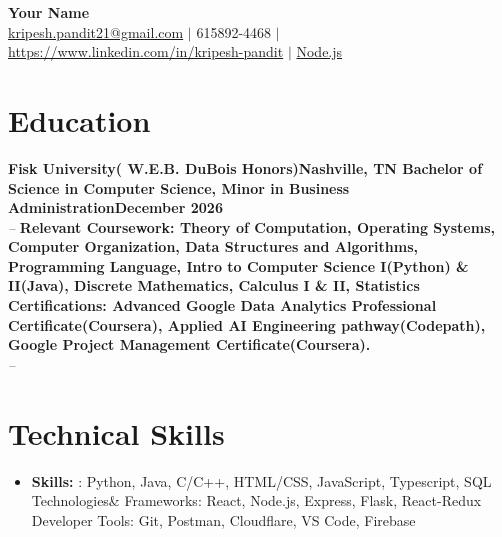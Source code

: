 \documentclass[letterpaper,11pt]{article}
\begin{document}
\begin{center}
  {\LARGE\bfseries Your Name} \\[4pt]
  \small
  \href{mailto:kripesh.pandit21@gmail.com}{kripesh.pandit21@gmail.com}   $|$ 615892-4468   $|$ \href{https://https://www.linkedin.com/in/kripesh-pandit}{https://www.linkedin.com/in/kripesh-pandit}     $|$ \href{https://Node.js}{Node.js}\end{center}

\section{Education}
\textbf{Fisk University( W.E.B. DuBois Honors)Nashville, TN
    Bachelor of Science in Computer Science, Minor in Business AdministrationDecember 2026} \hfill  \\
\textit{} \hfill \textit{ -- }
\vspace{2pt}\textbf{Relevant Coursework: Theory of Computation, Operating Systems, Computer Organization, Data Structures and Algorithms, Programming Language, Intro to Computer Science I(Python) \& II(Java), Discrete Mathematics, Calculus I \& II, Statistics 
 Certifications: Advanced Google Data Analytics Professional Certificate(Coursera), Applied AI Engineering pathway(Codepath), Google Project Management Certificate(Coursera).} \hfill  \\
\textit{} \hfill \textit{ -- }
\vspace{2pt}







\section{Technical Skills}
\begin{itemize}[label={}]
  \item \textbf{Skills:} : Python, Java, C/C++, HTML/CSS, JavaScript, Typescript, SQL 
   Technologies\& Frameworks: React, Node.js, Express, Flask, React-Redux 
  Developer Tools: Git, Postman, Cloudflare, VS Code, Firebase
\end{itemize}
\end{document}
